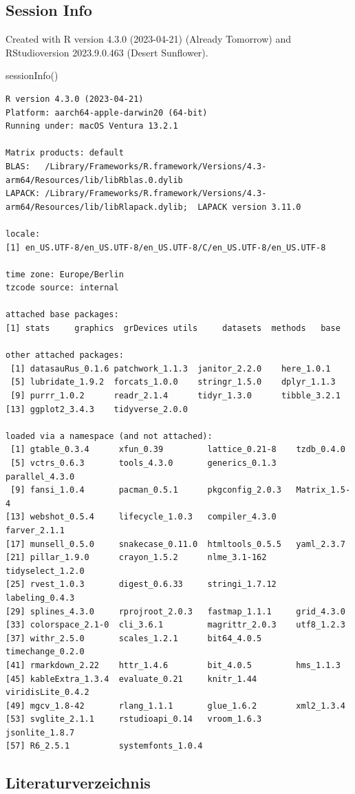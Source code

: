 \documentclass[
  letterpaper,
  DIV=11,
  numbers=noendperiod]{scrartcl}
\newenvironment{Shaded}{\begin{snugshade}}{\end{snugshade}}
\newcommand{\FunctionTok}[1]{\textcolor[rgb]{0.28,0.35,0.67}{#1}}
\newcommand{\NormalTok}[1]{\textcolor[rgb]{0.00,0.23,0.31}{#1}}
\newlength{\cslhangindent}
\newlength{\cslentryspacingunit} %
\newenvironment{CSLReferences}[2] %
 {%
  \setlength{\parindent}{0pt}
  \ifodd #1
  \let\oldpar\par
  \def\par{\hangindent=\cslhangindent\oldpar}
  \fi
  \setlength{\parskip}{#2\cslentryspacingunit}
 }%
 {}
\begin{document}
\hypertarget{session-info}{%
\subsection*{Session Info}\label{session-info}}

Created with R version 4.3.0 (2023-04-21) (Already Tomorrow) and
RStudioversion 2023.9.0.463 (Desert Sunflower).

\begin{Shaded}
\begin{Highlighting}[]
\FunctionTok{sessionInfo}\NormalTok{()}
\end{Highlighting}
\end{Shaded}

\begin{verbatim}
R version 4.3.0 (2023-04-21)
Platform: aarch64-apple-darwin20 (64-bit)
Running under: macOS Ventura 13.2.1

Matrix products: default
BLAS:   /Library/Frameworks/R.framework/Versions/4.3-arm64/Resources/lib/libRblas.0.dylib 
LAPACK: /Library/Frameworks/R.framework/Versions/4.3-arm64/Resources/lib/libRlapack.dylib;  LAPACK version 3.11.0

locale:
[1] en_US.UTF-8/en_US.UTF-8/en_US.UTF-8/C/en_US.UTF-8/en_US.UTF-8

time zone: Europe/Berlin
tzcode source: internal

attached base packages:
[1] stats     graphics  grDevices utils     datasets  methods   base     

other attached packages:
 [1] datasauRus_0.1.6 patchwork_1.1.3  janitor_2.2.0    here_1.0.1      
 [5] lubridate_1.9.2  forcats_1.0.0    stringr_1.5.0    dplyr_1.1.3     
 [9] purrr_1.0.2      readr_2.1.4      tidyr_1.3.0      tibble_3.2.1    
[13] ggplot2_3.4.3    tidyverse_2.0.0 

loaded via a namespace (and not attached):
 [1] gtable_0.3.4      xfun_0.39         lattice_0.21-8    tzdb_0.4.0       
 [5] vctrs_0.6.3       tools_4.3.0       generics_0.1.3    parallel_4.3.0   
 [9] fansi_1.0.4       pacman_0.5.1      pkgconfig_2.0.3   Matrix_1.5-4     
[13] webshot_0.5.4     lifecycle_1.0.3   compiler_4.3.0    farver_2.1.1     
[17] munsell_0.5.0     snakecase_0.11.0  htmltools_0.5.5   yaml_2.3.7       
[21] pillar_1.9.0      crayon_1.5.2      nlme_3.1-162      tidyselect_1.2.0 
[25] rvest_1.0.3       digest_0.6.33     stringi_1.7.12    labeling_0.4.3   
[29] splines_4.3.0     rprojroot_2.0.3   fastmap_1.1.1     grid_4.3.0       
[33] colorspace_2.1-0  cli_3.6.1         magrittr_2.0.3    utf8_1.2.3       
[37] withr_2.5.0       scales_1.2.1      bit64_4.0.5       timechange_0.2.0 
[41] rmarkdown_2.22    httr_1.4.6        bit_4.0.5         hms_1.1.3        
[45] kableExtra_1.3.4  evaluate_0.21     knitr_1.44        viridisLite_0.4.2
[49] mgcv_1.8-42       rlang_1.1.1       glue_1.6.2        xml2_1.3.4       
[53] svglite_2.1.1     rstudioapi_0.14   vroom_1.6.3       jsonlite_1.8.7   
[57] R6_2.5.1          systemfonts_1.0.4
\end{verbatim}

\hypertarget{literaturverzeichnis}{%
\subsection*{Literaturverzeichnis}\label{literaturverzeichnis}}

\hypertarget{refs}{}
\begin{CSLReferences}{0}{0}
\end{CSLReferences}
\end{document}
